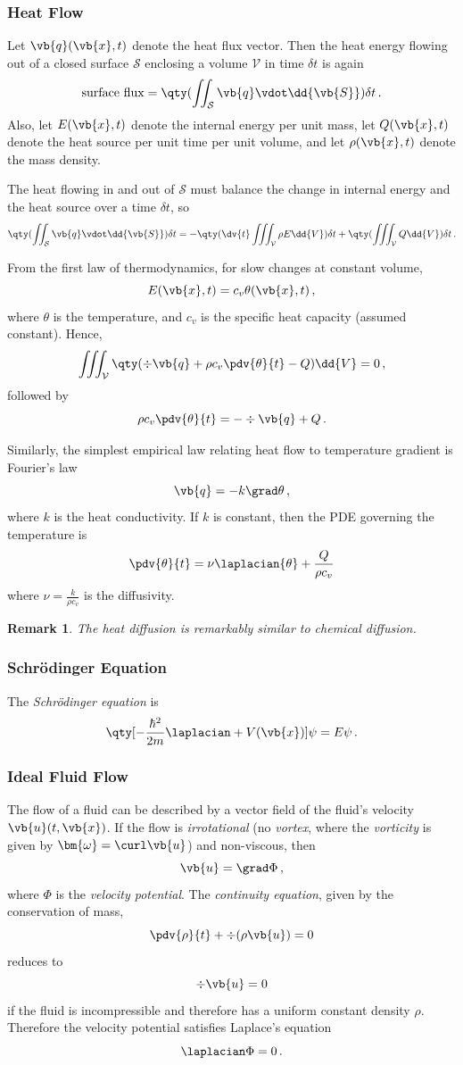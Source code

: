 \documentclass{article}
\theoremstyle{plain}\theoremheaderfont{\normalfont\itshape}\theorembodyfont{\rmfamily}\theoremseparator{.}\newtheorem*{rem}{Remark}\newtheorem*{ex}{Example}\newtheorem*{proof}{Proof}\newtheorem*{altp}{Alternative proof}
\theoremstyle{plain}\theoremheaderfont{\normalfont\bfseries}\theorembodyfont{\rmfamily}\theoremseparator{.}\newtheorem{thm}{Theorem}[section]\newtheorem{lem}[thm]{Lemma}\newtheorem{prop}[thm]{Proposition}\newtheorem*{cor}{Corollary}\newtheorem{defn}[thm]{Definition}\newtheorem{clm}[thm]{Claim}\newtheorem{clminproof}{Claim}
\theoremstyle{break}\theoremheaderfont{\normalfont\itshape}\theorembodyfont{\rmfamily}\theoremseparator{.\medskip}\newtheorem*{proofskip}{Proof}\newtheorem*{exs}{Examples}\newtheorem*{rems}{Remarks}
\theoremstyle{break}\theoremheaderfont{\normalfont\bfseries}\theorembodyfont{\rmfamily}\theoremseparator{.\medskip}\newtheorem{lemskip}[thm]{Lemma}\newtheorem{defnskip}[thm]{Definition}\newtheorem{propskip}[thm]{Proposition}\newtheorem{thmskip}[thm]{Theorem}
\numberwithin{equation}{section}
\begin{document}
	\subsubsection{Heat Flow}
	Let \(\vb{q}(\vb{x},t)\) denote the heat flux vector. Then the heat energy flowing out of a closed surface \(\mathcal{S}\) enclosing a volume \(\mathcal{V}\) in time \(\delta t\) is again
	\[\text{surface flux}=\qty(\iint_{\mathcal{S}}\vb{q}\vdot\dd{\vb{S}})\delta t\,.\]
	Also, let \(E(\vb{x},t)\) denote the internal energy per unit mass, let \(Q(\vb{x},t)\) denote the heat source per unit time per unit volume, and let \(\rho(\vb{x},t)\) denote the mass density.
	
	The heat flowing in and out of \(\mathcal{S}\) must balance the change in internal energy and the heat source over a time \(\delta t\), so
	\[\qty(\iint_{\mathcal{S}}\vb{q}\vdot\dd{\vb{S}})\delta t=-\qty(\dv{t}\iiint_{\mathcal{V}}\rho E\dd{V})\delta t+\qty(\iiint_{\mathcal{V}}Q\dd{V})\delta t\,.\]
	
	From the first law of thermodynamics, for slow changes at constant volume,
	\[E(\vb{x},t)=c_v\theta(\vb{x},t)\,,\]
	where \(\theta\) is the temperature, and \(c_v\) is the specific heat capacity (assumed constant).
	Hence,
	\[\iiint_{\mathcal{V}}\qty(\div{\vb{q}}+\rho c_v\pdv{\theta}{t}-Q)\dd{V}=0\,,\]
	followed by
	\[\rho c_v\pdv{\theta}{t}=-\div{\vb{q}}+Q\,.\]
	
	Similarly, the simplest empirical law relating heat flow to temperature gradient is Fourier's law
	\[\vb{q}=-k\grad\theta\,,\]
	where \(k\) is the heat conductivity. If \(k\) is constant, then the PDE governing the temperature is
	\[\pdv{\theta}{t}=\nu\laplacian{\theta}+\frac{Q}{\rho c_v}\]
	where \(\nu=\frac{k}{\rho c_v}\) is the diffusivity.
	
	\begin{rem}
		The heat diffusion is remarkably similar to chemical diffusion.
	\end{rem}
	
	\subsubsection{Schr\"{o}dinger Equation}
	The \textit{Schr\"{o}dinger equation} is
	\[\qty[-\frac{\hbar^2}{2m}\laplacian+V(\vb{x})]\psi=E\psi\,.\]
	\subsubsection{Ideal Fluid Flow}
	The flow of a fluid can be described by a vector field of the fluid's velocity \(\vb{u}(t,\vb{x})\). If the flow is \textit{irrotational} (no \textit{vortex}, where the \textit{vorticity} is given by \(\bm{\omega}=\curl\vb{u}\)) and non-viscous, then
	\[\vb{u}=\grad\Phi\,,\]
	where \(\Phi\) is the \textit{velocity potential}. The \textit{continuity equation}, given by the conservation of mass,
	\[\pdv{\rho}{t}+\div(\rho\vb{u})=0\]
	reduces to
	\[\div\vb{u}=0\]
	if the fluid is incompressible and therefore has a uniform constant density \(\rho\). Therefore the velocity potential satisfies Laplace's equation
	\[\laplacian\Phi=0\,.\]
\end{document}
